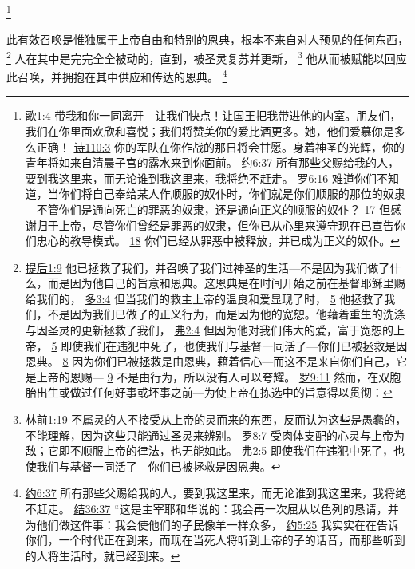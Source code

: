 \documentclass[12pt, a4paper, oneside]{ctexart}
\newcounter{parnum}[section]
\newcommand{\N}{%
   \noindent\refstepcounter{parnum}%
    \makebox[\parindent][l]{\textbf{\arabic{parnum}.}}}
\begin{document}
	\footnote {
		\href{https://biblehub.com/songs/1-4.htm}{歌1:4} 带我和你一同离开---让我们快点！让国王把我带进他的内室。朋友们，我们在你里面欢欣和喜悦；我们将赞美你的爱比酒更多。她，他们爱慕你是多么正确！
		\href{https://biblehub.com/psalms/110-3.htm}{诗110:3} 你的军队在你作战的那日将会甘愿。身着神圣的光辉，你的青年将如来自清晨子宫的露水来到你面前。
		\href{https://biblehub.com/john/6-37.htm}{约6:37} 所有那些父赐给我的人，要到我这里来，而无论谁到我这里来，我将绝不赶走。
		\href{https://biblehub.com/romans/6-16.htm}{罗6:16} 难道你们不知道，当你们将自己奉给某人作顺服的奴仆时，你们就是你们顺服的那位的奴隶---不管你们是通向死亡的罪恶的奴隶，还是通向正义的顺服的奴仆？
		\href{https://biblehub.com/romans/6-17.htm}{17} 但感谢归于上帝，尽管你们曾经是罪恶的奴隶，但你已从心里来遵守现在已宣告你们忠心的教导模式。
		\href{https://biblehub.com/romans/6-18.htm}{18} 你们已经从罪恶中被释放，并已成为正义的奴仆。
	}

\N 此有效召唤是惟独属于上帝自由和特别的恩典，根本不来自对人预见的任何东西，
	\footnote {
		\href{https://biblehub.com/2_timothy/1-9.htm}{提后1:9} 他已拯救了我们，并召唤了我们过神圣的生活---不是因为我们做了什么，而是因为他自己的旨意和恩典。这恩典是在时间开始之前在基督耶稣里赐给我们的，
		\href{https://biblehub.com/titus/3-4.htm}{多3:4} 但当我们的救主上帝的温良和爱显现了时，
		\href{https://biblehub.com/titus/3-5.htm}{5} 他拯救了我们，不是因为我们已做了的正义行为，而是因为他的宽恕。他藉着重生的洗涤与因圣灵的更新拯救了我们，
		\href{https://biblehub.com/ephesians/2-4.htm}{弗2:4} 但因为他对我们伟大的爱，富于宽恕的上帝，
		\href{https://biblehub.com/ephesians/2-5.htm}{5} 即使我们在违犯中死了，也使我们与基督一同活了---你们已被拯救是因恩典。 
		\href{https://biblehub.com/ephesians/2-8.htm}{8} 因为你们已被拯救是由恩典，藉着信心---而这不是来自你们自己，它是上帝的恩赐---
		\href{https://biblehub.com/ephesians/2-9.htm}{9} 不是由行为，所以没有人可以夸耀。
		\href{https://biblehub.com/romans/9-11.htm}{罗9:11} 然而，在双胞胎出生或做过任何好事或坏事之前---为使上帝在拣选中的旨意得以贯彻：
	}
	人在其中是完完全全被动的，直到，被圣灵复苏并更新，
	\footnote {
		\href{https://biblehub.com/1_corinthians/2-14.htm}{林前1:19} 不属灵的人不接受从上帝的灵而来的东西，反而认为这些是愚蠢的，不能理解，因为这些只能通过圣灵来辨别。
		\href{https://biblehub.com/romans/8-7.htm}{罗8:7} 受肉体支配的心灵与上帝为敌；它即不顺服上帝的律法，也无能如此。
		\href{https://biblehub.com/ephesians/2-5.htm}{弗2:5} 即使我们在违犯中死了，也使我们与基督一同活了---你们已被拯救是因恩典。 
	}
	他从而被赋能以回应此召唤，并拥抱在其中供应和传达的恩典。
	\footnote {
		\href{https://biblehub.com/john/6-37.htm}{约6:37} 所有那些父赐给我的人，要到我这里来，而无论谁到我这里来，我将绝不赶走。
		\href{https://biblehub.com/ezekiel/36-37.htm}{结36:37} “这是主宰耶和华说的：我会再一次屈从以色列的恳请，并为他们做这件事：我会使他们的子民像羊一样众多，
		\href{https://biblehub.com/john/5-25.htm}{约5:25} 我实实在在告诉你们，一个时代正在到来，而现在当死人将听到上帝的子的话音，而那些听到的人将生活时，就已经到来。
	}
\end{document}
